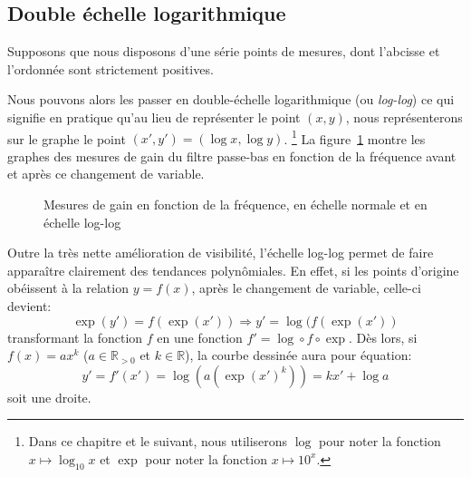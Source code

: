 \subsection{Double échelle logarithmique}
\label{subsec:approx-lin/pres/loglog}

Supposons que nous disposons d'une série points de mesures,
dont l'abcisse et l'ordonnée sont strictement positives.

Nous pouvons alors les passer
en double-échelle logarithmique (ou \emph{log-log})
ce qui signifie en pratique qu'au lieu de représenter le point $(x,y)$,
nous représenterons sur le graphe le point $(x',y') = (\log x,\log y)$.%
\footnote{
    Dans ce chapitre et le suivant, nous utiliserons
    $\log$ pour noter la fonction $x \mapsto \log_{10} x$
    et $\exp$ pour noter la fonction $x \mapsto 10^x$.
}
La figure~\ref{fig:regular-to-loglog} montre les graphes
des mesures de gain du filtre passe-bas en fonction de la fréquence
avant et après ce changement de variable.

\begin{figure}[h!]
    \centering
    \qquad
    \caption{Mesures de gain en fonction de la fréquence, en échelle normale et en échelle log-log}
    \label{fig:regular-to-loglog}
\end{figure}

Outre la très nette amélioration de visibilité,
l'échelle log-log permet de faire apparaître clairement
des tendances polynômiales.
En effet, si les points d'origine obéissent à la relation $y = f(x)$,
après le changement de variable, celle-ci devient:
\begin{equation}
    \exp(y') = f(\exp(x')) \Longrightarrow y' = \log(f(\exp(x'))
\end{equation}
transformant la fonction $f$ en une fonction $f' = \log\circ f\circ\exp$.
Dès lors, si $f(x) = ax^k$ ($a \in \mathbb{R}_{>0}$ et $k \in \mathbb{R}$),
la courbe dessinée aura pour équation:
\begin{equation}
    y' = f'(x') = \log(a(\exp(x')^k)) = kx'+\log a
\end{equation}
soit une droite.

